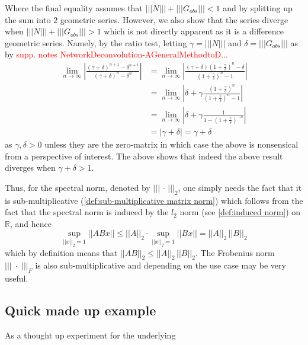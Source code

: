 \documentclass[../Thesis.tex]{subfiles}
\begin{document}
Where the final equality assumes that $\left|\left|\left| N \right|\right|\right| + \left|\left|\left| G_{obs} \right|\right|\right| < 1$ and by splitting up the sum into $2$ geometric series. However, we also show that the series diverge when $\left|\left|\left| N \right|\right|\right| + \left|\left|\left| G_{obs} \right|\right|\right| > 1$ which is not directly apparent as it is a difference geometric series. Namely, by the ratio test, letting $\gamma = \left|\left|\left| N \right|\right|\right|$ and $\delta = \left|\left|\left| G_{obs} \right|\right|\right|$ as by \textcolor{red}{supp. notes NetworkDeconvolution-AGeneralMethodtoD...}
\begin{align*}
    \lim_{n\to \infty} \left|\frac{ \left(\gamma + \delta\right)^{n+1} - \delta^{n+1}}{\left(\gamma + \delta\right)^n - \delta^n}\right| &= \lim_{n\to \infty}\left|\frac{ \left(\gamma + \delta\right) \left(1 + \frac{\gamma}{\delta}\right)^n - \delta}{\left(1 + \frac{\gamma}{\delta} \right)^n - 1}\right|\\
    & = \lim_{n\to \infty}\left|\delta + \gamma \frac{\left(1 + \frac{\gamma}{\delta} \right)^n}{\left(1 + \frac{\gamma}{\delta} \right)^n - 1}\right|\\
    & = \lim_{n\to \infty} \left|\delta + \gamma \frac{1}{1 - \left( 1 + \frac{\gamma}{\delta} \right) ^{-n}}\right|\\
    & = \left| \gamma + \delta \right| = \gamma + \delta
\end{align*}
as $\gamma, \delta > 0$ unless they are the zero-matrix in which case the above is nonsensical from a perspective of interest. The above shows that indeed the above result diverges when $\gamma + \delta > 1$.

Thus, for the spectral norm, denoted by $\left|\left|\left|\, \cdot \,\right|\right|\right|_2$, one simply needs the fact that it is sub-multiplicative (\autoref{def:sub-multiplicative matrix norm}) which follows from the fact that the spectral norm is induced by the $l_2$ norm (see \autoref{def:induced norm}) on $\mathbb{R}$, and hence
$$\sup_{||x||_2 = 1}\left|\left|ABx\right|\right| \leq \left|\left|A\right|\right|_2 \cdot \sup_{\left|\left|x\right|\right|_2=1}{\left|\left|Bx\right|\right|} = \left|\left|A\right|\right|_2\, \left|\left|B\right|\right|_2$$
which by definition means that $||AB||_2 \leq ||A||_2\, ||B||_2$. The Frobenius norm $\left|\left|\left|\; \cdot \;\right|\right|\right|_F$ is also sub-multiplicative and depending on the use case may be very useful.






\subsection{Quick made up example}
As a thought up experiment for the underlying
\end{document}
